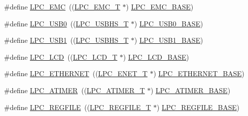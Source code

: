 \begin{DoxyCompactItemize}
\item 
\#define \hyperlink{group___p_e_r_i_p_h__43_x_x___b_a_s_e_ga115afed5bd08559bbc4eba50e7c23495}{L\+P\+C\+\_\+\+E\+MC}~((\hyperlink{struct_l_p_c___e_m_c___t}{L\+P\+C\+\_\+\+E\+M\+C\+\_\+T}              $\ast$) \hyperlink{group___p_e_r_i_p_h__43_x_x___b_a_s_e_ga52f586bf3c6855ad4ef03b1fee3f2f0d}{L\+P\+C\+\_\+\+E\+M\+C\+\_\+\+B\+A\+SE})
\item 
\#define \hyperlink{group___p_e_r_i_p_h__43_x_x___b_a_s_e_ga25ec9d077b8c13aadf9ca3c872c5c8d1}{L\+P\+C\+\_\+\+U\+S\+B0}~((\hyperlink{struct_l_p_c___u_s_b_h_s___t}{L\+P\+C\+\_\+\+U\+S\+B\+H\+S\+\_\+T}            $\ast$) \hyperlink{group___p_e_r_i_p_h__43_x_x___b_a_s_e_ga41d15fd328f821807d202d6c9feb096c}{L\+P\+C\+\_\+\+U\+S\+B0\+\_\+\+B\+A\+SE})
\item 
\#define \hyperlink{group___p_e_r_i_p_h__43_x_x___b_a_s_e_gab2ca840614a0bf9f3d042a75f49bc9c8}{L\+P\+C\+\_\+\+U\+S\+B1}~((\hyperlink{struct_l_p_c___u_s_b_h_s___t}{L\+P\+C\+\_\+\+U\+S\+B\+H\+S\+\_\+T}            $\ast$) \hyperlink{group___p_e_r_i_p_h__43_x_x___b_a_s_e_ga72922dbb8f7e3016015922b225773710}{L\+P\+C\+\_\+\+U\+S\+B1\+\_\+\+B\+A\+SE})
\item 
\#define \hyperlink{group___p_e_r_i_p_h__43_x_x___b_a_s_e_ga68cb24e38b29356c45f9bb634b35c677}{L\+P\+C\+\_\+\+L\+CD}~((\hyperlink{struct_l_p_c___l_c_d___t}{L\+P\+C\+\_\+\+L\+C\+D\+\_\+T}              $\ast$) \hyperlink{group___p_e_r_i_p_h__43_x_x___b_a_s_e_gae1746cd618a1eb4f24f95255594f159a}{L\+P\+C\+\_\+\+L\+C\+D\+\_\+\+B\+A\+SE})
\item 
\#define \hyperlink{group___p_e_r_i_p_h__43_x_x___b_a_s_e_gaddb977e4442891b21ced3344c71440d7}{L\+P\+C\+\_\+\+E\+T\+H\+E\+R\+N\+ET}~((\hyperlink{struct_l_p_c___e_n_e_t___t}{L\+P\+C\+\_\+\+E\+N\+E\+T\+\_\+T}             $\ast$) \hyperlink{group___p_e_r_i_p_h__43_x_x___b_a_s_e_ga7da6912c1d137fdfb86cedc9efb8c8d6}{L\+P\+C\+\_\+\+E\+T\+H\+E\+R\+N\+E\+T\+\_\+\+B\+A\+SE})
\item 
\#define \hyperlink{group___p_e_r_i_p_h__43_x_x___b_a_s_e_ga3e623a85783fae5ce265530fc079841c}{L\+P\+C\+\_\+\+A\+T\+I\+M\+ER}~((\hyperlink{struct_l_p_c___a_t_i_m_e_r___t}{L\+P\+C\+\_\+\+A\+T\+I\+M\+E\+R\+\_\+T}           $\ast$) \hyperlink{group___p_e_r_i_p_h__43_x_x___b_a_s_e_gaccf3a9c6522b5cfc6d9ddc21f0500ec0}{L\+P\+C\+\_\+\+A\+T\+I\+M\+E\+R\+\_\+\+B\+A\+SE})
\item 
\#define \hyperlink{group___p_e_r_i_p_h__43_x_x___b_a_s_e_ga2c74da31b7fd461d9b01e3241963f895}{L\+P\+C\+\_\+\+R\+E\+G\+F\+I\+LE}~((\hyperlink{struct_l_p_c___r_e_g_f_i_l_e___t}{L\+P\+C\+\_\+\+R\+E\+G\+F\+I\+L\+E\+\_\+T}          $\ast$) \hyperlink{group___p_e_r_i_p_h__43_x_x___b_a_s_e_gad2674eff10cea9243ab060ad1fbac9d2}{L\+P\+C\+\_\+\+R\+E\+G\+F\+I\+L\+E\+\_\+\+B\+A\+SE})

\end{DoxyCompactItemize}
